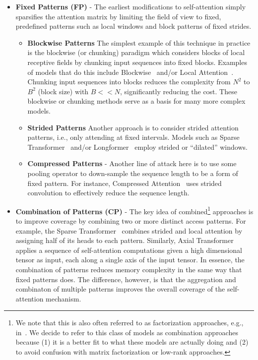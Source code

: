 \begin{itemize}
\item \textbf{Fixed Patterns (FP)} - The earliest modifications to self-attention simply sparsifies the attention matrix by limiting the field of view to fixed, predefined patterns such as local windows and block patterns of fixed strides.
\begin{itemize}
    \item \textbf{Blockwise Patterns} The simplest example of this technique in practice is the blockwise (or chunking) paradigm which considers blocks of local receptive fields by chunking input sequences into fixed blocks. Examples of models that do this include Blockwise~\citep{qiu2019blockwise} and/or Local Attention~\citep{parmar2018image}. Chunking input sequences into blocks reduces the complexity from $N^2$ to $B^2$ (block size) with $B<<N$, significantly reducing the cost. These blockwise or chunking methods serve as a basis for many more complex models. 
    \item \textbf{Strided Patterns} Another approach is to consider strided attention patterns, i.e., only attending at fixed intervals. Models such as Sparse Transformer~\citep{child2019generating} and/or Longformer~\citep{beltagy2020longformer} employ strided or ``dilated'' windows.
    \item \textbf{Compressed Patterns} - Another line of attack here is to use some pooling operator to down-sample the sequence length to be a form of fixed pattern. For instance, Compressed Attention~\citep{liu2018generating} uses strided convolution to effectively reduce the sequence length.
\end{itemize}
\item \textbf{Combination of Patterns (CP)} - The key idea of combined\footnote{We note that this is also often referred to as factorization approaches, e.g., in~\citet{child2019generating}. We decide to refer to this class of models as combination approaches because (1) it is a better fit to what these models are actually doing and (2) to avoid confusion with matrix factorization or low-rank approaches. } approaches is to improve coverage by combining two or more distinct access patterns. For example, the Sparse Transformer~\citep{child2019generating} combines strided and local attention by assigning half of its heads to each pattern. Similarly, Axial Transformer~\citep{ho2019axial} applies a sequence of self-attention computations given a high dimensional tensor as input, each along a single axis of the input tensor. In essence, the combination of patterns reduces memory complexity in the same way that fixed patterns does. The difference, however, is that the aggregation and combinaton of multiple patterns improves the overall coverage of the self-attention mechanism.

\end{itemize}
